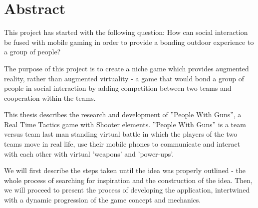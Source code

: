 \section{Abstract}

This project has started with the following question: How can social interaction
be fused with mobile gaming in order to provide a bonding outdoor experience to
a group of people?\newline

The purpose of this project is to create a niche game which provides augmented
reality, rather than augmented virtuality - a game that would bond a group of
people in social interaction by adding competition between two teams and
cooperation within the teams.\newline

This thesis describes the research and development of ''People With Guns'', a
Real Time Tactics game with Shooter elements. ''People With Guns'' is a team
versus team last man standing virtual battle in which the players of the two
teams move in real life, use their mobile phones to communicate and interact
with each other with virtual 'weapons' and 'power-ups'.\newline

We will first describe the steps taken until the idea was properly outlined -
the whole process of searching for inspiration and the construction of the idea.
Then, we will proceed to present the process of developing the application,
intertwined with a dynamic progression of the game concept and
mechanics.\newline
